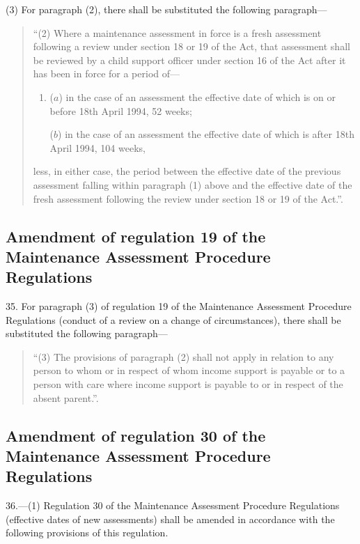 \documentclass[12pt,a4paper]{article}
\begin{document}
(3) For paragraph (2), there shall be substituted the following paragraph—
\begin{quotation}
“(2) Where a maintenance assessment in force is a fresh assessment following a review under section 18 or 19 of the Act, that assessment shall be reviewed by a child support officer under section 16 of the Act after it has been in force for a period of—
\begin{enumerate}\item[]
($a$) in the case of an assessment the effective date of which is on or before 18th April 1994, 52 weeks;

($b$) in the case of an assessment the effective date of which is after 18th April 1994, 104 weeks,
\end{enumerate}
less, in either case, the period between the effective date of the previous assessment falling within paragraph (1) above and the effective date of the fresh assessment following the review under section 18 or 19 of the Act.”.
\end{quotation}

\subsection[35. Amendment of regulation 19 of the Maintenance Assessment Procedure Regulations]{Amendment of regulation 19 of the Maintenance Assessment Procedure Regulations}

35.  For paragraph (3) of regulation 19 of the Maintenance Assessment Procedure Regulations (conduct of a review on a change of circumstances), there shall be substituted the following paragraph—
\begin{quotation}
“(3) The provisions of paragraph (2) shall not apply in relation to any person to whom or in respect of whom income support is payable or to a person with care where income support is payable to or in respect of the absent parent.”.
\end{quotation}

\subsection[36. Amendment of regulation 30 of the Maintenance Assessment Procedure Regulations]{Amendment of regulation 30 of the Maintenance Assessment Procedure Regulations}

36.—(1) Regulation 30 of the Maintenance Assessment Procedure Regulations (effective dates of new assessments) shall be amended in accordance with the following provisions of this regulation.
\end{document}
